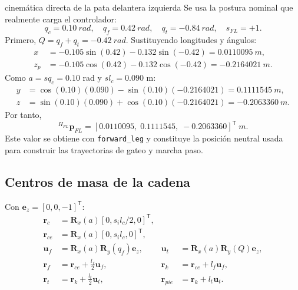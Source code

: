 \documentclass[11pt,letterpaper]{article}
\newcommand{\vect}[1]{\bm{#1}}
\newcommand{\mat}[1]{\bm{#1}}
\newcommand{\trans}{^{\mathsf T}}
\begin{document}
\begin{workedexample}{cinemática directa de la pata delantera izquierda}
Se usa la postura nominal que realmente carga el controlador:
\[
 q_c=\SI{0.10}{rad},\quad q_f=\SI{0.42}{rad},\quad
 q_t=\SI{-0.84}{rad},\quad s_{FL}=+1.
\]
Primero, $Q=q_f+q_t=\SI{-0.42}{rad}$. Sustituyendo longitudes y ángulos:
\begin{align*}
 x&=-0.105\sin(0.42)-0.132\sin(-0.42)
    =\SI{0.0110095}{m},\\
 z_p&=-0.105\cos(0.42)-0.132\cos(-0.42)
    =\SI{-0.2164021}{m}.
\end{align*}
Como $a=sq_c=0.10$ rad y $s l_c=0.090$ m:
\begin{align*}
 y&=\cos(0.10)(0.090)-\sin(0.10)(-0.2164021)
   =\SI{0.1111545}{m},\\
 z&=\sin(0.10)(0.090)+\cos(0.10)(-0.2164021)
   =\SI{-0.2063360}{m}.
\end{align*}
Por tanto,
\[
 \boxed{{}^{H_{FL}}\vect p_{FL}=
 [0.0110095,\;0.1111545,\;-0.2063360]\trans\ \si{m}}.
\]
Este valor se obtiene con \texttt{forward\_leg} y constituye la posición
neutral usada para construir las trayectorias de gateo y marcha paso.
\end{workedexample}

\subsection{Centros de masa de la cadena}
Con $\vect e_z=[0,0,-1]\trans$:
\begin{align}
 \vect r_c &=\mat R_x(a)[0,s_il_c/2,0]\trans,\\
 \vect r_{ce}&=\mat R_x(a)[0,s_il_c,0]\trans,\\
 \vect u_f&=\mat R_x(a)\mat R_y(q_f)\vect e_z,
 &\vect u_t&=\mat R_x(a)\mat R_y(Q)\vect e_z,\\
 \vect r_f&=\vect r_{ce}+\tfrac{l_f}{2}\vect u_f,
 &\vect r_k&=\vect r_{ce}+l_f\vect u_f,\\
 \vect r_t&=\vect r_k+\tfrac{l_t}{2}\vect u_t,
 &\vect r_{pie}&=\vect r_k+l_t\vect u_t.
\end{align}
\end{document}
